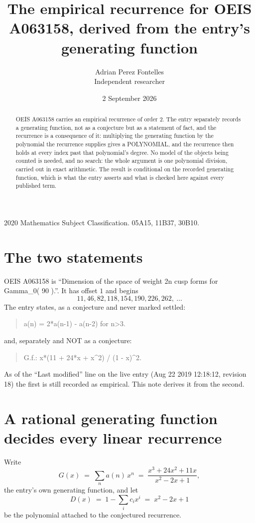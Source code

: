 \documentclass[11pt,a4paper]{article}
\title{The empirical recurrence for OEIS A063158, derived from the entry's generating function}
\author{Adrian Perez Fontelles\\ \small Independent researcher}
\date{2 September 2026}
\theoremstyle{plain}
\theoremstyle{definition}
\begin{document}
\maketitle

\begin{abstract}
OEIS A063158 carries an empirical recurrence of order $2$. The entry separately records a
generating function, not as a conjecture but as a statement of fact, and the recurrence is a
consequence of it: multiplying the generating function by the polynomial the recurrence
supplies gives a POLYNOMIAL, and the recurrence then holds at every index past that
polynomial's degree. No model of the objects being counted is needed, and no search: the
whole argument is one polynomial division, carried out in exact arithmetic. The result is
conditional on the recorded generating function, which is what the entry asserts and what is
checked here against every published term.
\end{abstract}

\noindent\small 2020 Mathematics Subject Classification. 05A15, 11B37, 30B10.\normalsize

\section{The two statements}

OEIS A063158 is ``Dimension of the space of weight 2n cusp forms for Gamma\_0( 90 ).''. It has offset $1$ and begins
\[
11, 46, 82, 118, 154, 190, 226, 262,\ \dots
\]
The entry states, as a conjecture and never marked settled:
\begin{quote}
a(n) = 2*a(n-1) - a(n-2) for n>3.
\end{quote}
and, separately and NOT as a conjecture:
\begin{quote}
G.f.: x*(11 + 24*x + x\^{}2) / (1 - x)\^{}2.
\end{quote}
As of the ``Last modified'' line on the live entry (Aug 22 2019 12:18:12, revision 18) the first is still
recorded as empirical. This note derives it from the second.

\section{A rational generating function decides every linear recurrence}

Write
\[
G(x)\;=\;\sum_{n}a(n)\,x^{n}\;=\;\frac{x^{3} + 24 x^{2} + 11 x}{x^{2} - 2 x + 1},
\]
the entry's own generating function, and let
\[
D(x)\;=\;1-\sum_i c_i x^{i}\;=\;x^{2} - 2 x + 1
\]
be the polynomial attached to the conjectured recurrence.
\end{document}
